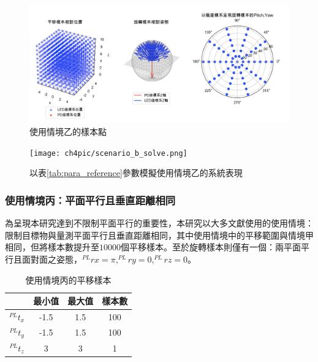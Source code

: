   

\begin{figure}[htpb]
    \centering
    \includegraphics[width=15cm]{ch4pic/b_scenario.png}
    \caption{使用情境乙的樣本點}
    \label{pic:b_scenario}
\end{figure}

\begin{figure}[htpb]
    \centering
    \texttt{[image: ch4pic/scenario\_b\_solve.png]}
    \caption{以表\ref{tab:para_reference}參數模擬使用情境乙的系統表現}
    \label{pic:scenario_b_solve}
\end{figure}

\subsubsection{使用情境丙：平面平行且垂直距離相同}

為呈現本研究達到不限制平面平行的重要性，本研究以大多文獻使用的使用情境：限制目標物與量測平面平行且垂直距離相同，其中使用情境中的平移範圍與情境甲相同，但將樣本數提升至$10000$個平移樣本。至於旋轉樣本則僅有一個：兩平面平行且面對面之姿態，$^{PL}rx=\pi,^{PL}ry=0,^{PL}rz=0$。

\begin{table}[htpb]
    \begin{center}
      \caption{使用情境丙的平移樣本}
      \label{tab:C_translate}
      \begin{tabular}{c|c|c|c} %
         & \textbf{最小值} & \textbf{最大值}&\textbf{樣本數}\\
        \hline
        $^{PL}t_x$ & -1.5 &1.5&100\\
        $^{PL}t_y$ & -1.5 & 1.5&100\\
        $^{PL}t_z$ & 3 & 3 &1\\
      \end{tabular}
    \end{center}
  \end{table}

